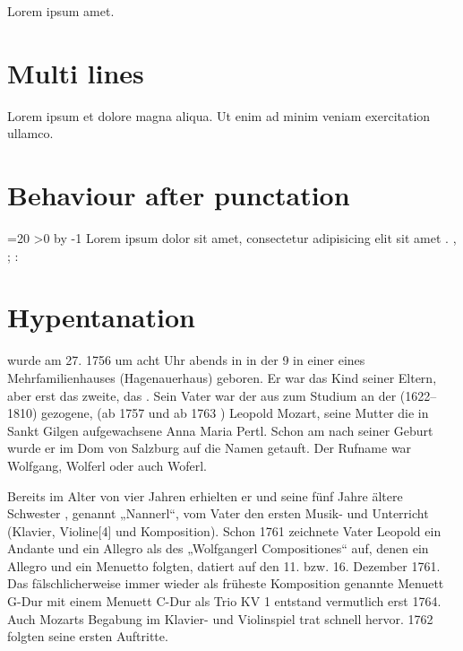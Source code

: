 \documentclass{article}
\begin{document}
Lorem ipsum  amet.

\section{Multi lines}


Lorem ipsum  et dolore magna aliqua. Ut enim ad
minim veniam exercitation ullamco.

\section{Behaviour after punctation}

\def\clozepunctation{%
  Lorem ipsum dolor sit amet, consectetur adipisicing elit sit amet
  \cloze{Lorem}.
  \cloze{ipsum},
  \cloze{dolor};
  \cloze{sit}: %
}

\def\Repeat[#1]#2{
  \count0=#1
  \loop
  \ifnum\count0>0
  \advance{} by -1
  #2%
  \repeat
}
\Repeat[20]\clozepunctation %

\section{Hypentanation}

 wurde am 27.  1756 um acht
Uhr abends in  in der  9 in einer
 eines Mehrfamilienhauses
(Hagenauerhaus) geboren. Er war das  Kind seiner Eltern,
aber erst das zweite, das . Sein Vater war der aus
 zum Studium an der 
(1622–1810)  gezogene,  (ab 1757  und ab 1763
) Leopold Mozart, seine Mutter die in Sankt
Gilgen aufgewachsene Anna Maria Pertl. Schon am  nach
seiner Geburt wurde er im Dom von Salzburg auf die Namen  getauft. Der Rufname war Wolfgang,
Wolferl oder auch Woferl.

Bereits im Alter von vier Jahren erhielten er und seine fünf Jahre
ältere Schwester , genannt „Nannerl“, vom
Vater den ersten Musik- und  Unterricht (Klavier,
Violine[4] und Komposition). Schon 1761 zeichnete Vater Leopold ein
Andante und ein Allegro als des „Wolfgangerl Compositiones“ auf, denen
ein Allegro und ein Menuetto folgten, datiert auf den 11. bzw. 16.
Dezember 1761. Das fälschlicherweise immer wieder als früheste
Komposition genannte Menuett G-Dur mit einem Menuett C-Dur als Trio KV 1
entstand vermutlich erst 1764. Auch Mozarts Begabung im Klavier- und
Violinspiel trat schnell hervor. 1762 folgten seine ersten Auftritte.
\end{document}
